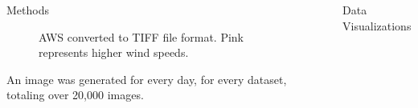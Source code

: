\documentclass[final]{beamer}
\newlength{\sepwidth}
\newlength{\colwidth}
\newcommand{\separatorcolumn}{\begin{column}{\sepwidth}\end{column}}
\begin{document}
\begin{frame}[t]
\begin{columns}[t]
\begin{column}{\colwidth}
\begin{block}{Methods}
\begin{figure}
\begin{minipage}{0.5\textwidth}
        \caption{AWS converted to TIFF file format. Pink represents higher wind speeds.}
        \label{fig:2DCAwind.png}
    \end{minipage}
\end{figure}

    An image was generated for every day, for every dataset, totaling over 20,000 images.

  \end{block}

  
\end{column}

\separatorcolumn

\begin{column}{\colwidth}

  \begin{block}{Data Visualizations}


\end{block}
\end{column}
\end{columns}
\end{frame}
\end{document}
